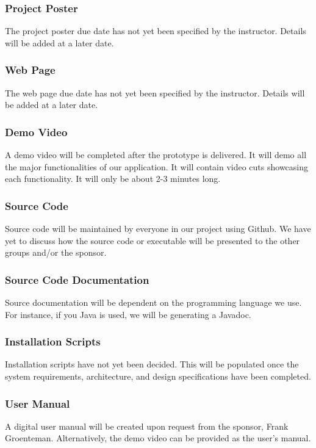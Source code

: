 \subsubsection{Project Poster}
The project poster due date has not yet been specified by the instructor. Details will be added at a later date.

\subsubsection{Web Page}
The web page due date has not yet been specified by the instructor. Details will be added at a later date.


\subsubsection{Demo Video}
A demo video will be completed after the prototype is delivered. It will demo all the major functionalities of our application. It will contain video cuts showcasing each functionality. It will only be about 2-3 minutes long.

\subsubsection{Source Code}
Source code will be maintained by everyone in our project using Github. We have yet to discuss how the source code or executable will be presented to the other groups and/or the sponsor.

\subsubsection{Source Code Documentation}
Source documentation will be dependent on the programming language we use. For instance, if you Java is used, we will be generating a Javadoc.






\subsubsection{Installation Scripts}
Installation scripts have not yet been decided. This will be populated once the system requirements, architecture, and design specifications have been completed.

\subsubsection{User Manual}
A digital user manual will be created upon request from the sponsor, Frank Groenteman. Alternatively, the demo video can be provided as the user’s manual.

